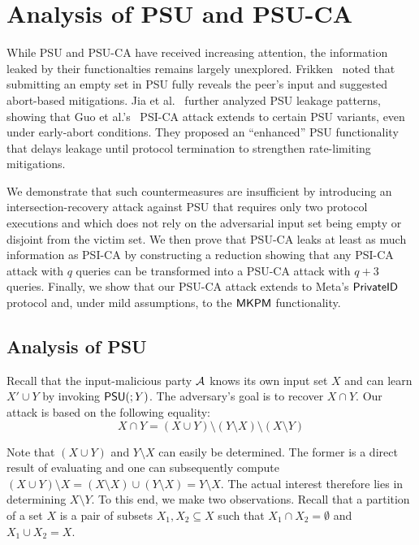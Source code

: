 \section{Analysis of PSU and PSU-CA}

While PSU and PSU-CA have received increasing attention, the information leaked by their functionalties remains largely unexplored. Frikken~\cite{ACNS:Frikken07} noted that submitting an empty set in PSU fully reveals the peer's input and suggested abort-based mitigations. Jia et al.~\cite{USENIX:JSZG24} further analyzed PSU leakage patterns, showing that Guo et al.'s~\cite{USENIX:GHLWJL22} PSI-CA attack extends to certain PSU variants, even under early-abort conditions. They proposed an ``enhanced'' PSU functionality that delays leakage until protocol termination to strengthen rate-limiting mitigations.


We demonstrate that such countermeasures are insufficient by introducing an intersection-recovery attack against PSU that requires only two protocol executions and which does not rely on the adversarial input set being empty or disjoint from the victim set. We then prove that PSU-CA leaks at least as much information as PSI-CA by constructing a reduction showing that any PSI-CA attack with $q$ queries can be transformed into a PSU-CA attack with $q{+}3$ queries. Finally, we show that our PSU-CA attack extends to Meta's $\mathsf{PrivateID}$ protocol and, under mild assumptions, to the $\mathsf{MKPM}$ functionality.


\subsection{Analysis of PSU}\label{sec:psu-attack}

Recall that the input-malicious party $\mathcal{A}$ knows its own input set $X$
and can learn $X' \cup Y$ by invoking $\mathsf{PSU}(;Y)$. The adversary's goal is to recover $X \cap Y$.
Our attack is based on the following equality:
\begin{equation}
	\label{eqn:PSU_basis}
	X \cap Y = (X \cup Y) \setminus (Y \setminus X) \setminus (X \setminus Y)
\end{equation} 

Note that $(X\cup Y)$ and $Y\setminus X$ can easily be determined.
The former is a direct result of evaluating \PSU{} and one can subsequently compute
$(X \cup Y) \setminus X = (X \setminus X) \cup (Y \setminus X) = Y \setminus X$.
The actual interest therefore lies in determining $X\setminus Y$.
To this end, we make two observations.
Recall that a partition of a set $X$ is a pair of subsets $X_1, X_2 \subseteq X$ such that $X_1 \cap X_2 = \emptyset$ and $X_1 \cup X_2 = X$.

